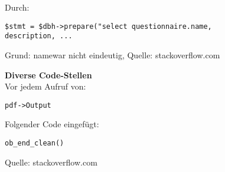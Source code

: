 \bigskip
\noindent Durch:
\begin{lstlisting}[backgroundcolor = \color{lightgray}]
$stmt = $dbh->prepare("select questionnaire.name, 
description, ...
\end{lstlisting}

\noindent Grund: \glqq name\grqq war nicht eindeutig, Quelle: stackoverflow.com \cite{mysql-column-problem}


\bigskip
\noindent\textbf{Diverse Code-Stellen} \\

\noindent Vor jedem Aufruf von:
\begin{lstlisting}[backgroundcolor = \color{lightgray}]
pdf->Output
\end{lstlisting}

\bigskip
\noindent Folgender Code eingefügt:
\begin{lstlisting}[backgroundcolor = \color{lightgray}]
ob_end_clean()
\end{lstlisting}

Quelle: stackoverflow.com \cite{tcpdf-error}